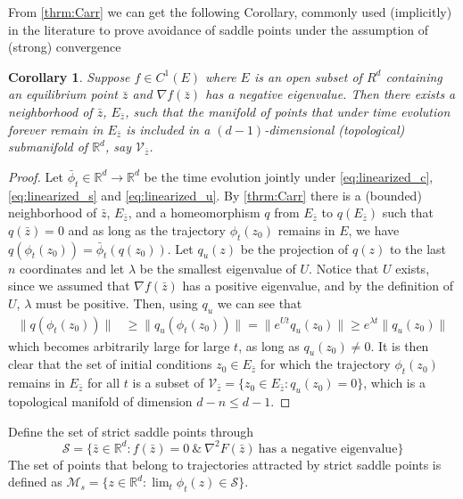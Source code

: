 \documentclass[reqno]{amsart}
\theoremstyle{plain}
\newtheorem{corollary}{Corollary}	%
\theoremstyle{definition}
\theoremstyle{remark}
\begin{document}
From \ref{thrm:Carr} we can get the following Corollary, commonly used (implicitly) in the literature to prove avoidance of saddle points under the assumption of (strong) convergence \cite{castera2023inertial,maulen2024inertial}
\begin{corollary}
\label{cor:avoidstrong}
	Suppose $f \in C^{1}(E)$ where $E$ is an open subset of $R^{d}$ containing an equilibrium point $\bar{z}$ and $\nabla f(\bar{z})$ has a negative eigenvalue. Then there exists a neighborhood of $\bar{z}$, $E_{\bar{z}}$, such that the manifold of points that under time evolution forever remain in $E_{\bar{z}}$ is included in a $(d-1)$-dimensional (topological) submanifold of $\mathbb{R}^{d}$, say $\mathcal{V}_{\bar{z}}$.
\end{corollary}
\begin{proof}
    Let $\bar{\phi}_t \in \mathbb{R}^d\to\mathbb{R}^d$ be the time evolution jointly under \eqref{eq:linearized_c}, \eqref{eq:linearized_s} and \eqref{eq:linearized_u}.
    By \ref{thrm:Carr} there is a (bounded) neighborhood of $\bar{z}$, $E_{\bar{z}}$, and a homeomorphism $q$ from $E_{\bar{z}}$ to $q(E_{\bar{z}})$ such that $q(\bar{z})=0$ and as long as the trajectory $\phi_t(z_0)$ remains in $E$, we have $q(\phi_t(z_0)) = \bar{\phi}_t(q(z_0))$. 
    Let $q_u(z)$ be the projection of $q(z)$ to the last $n$ coordinates and let $\lambda$ be the smallest eigenvalue of $U$. 
    Notice that $U$ exists, since we assumed that $\nabla f (\bar{z})$ has a positive eigenvalue, and by the definition of $U$, $\lambda$ must be positive. 
    Then, using $q_u$ we can see that
    \begin{align}
        \| q(\phi_t(z_0)) \| &\geq \| q_u(\phi_t(z_0)) \| 
        = \| e^{Ut} q_u(z_0) \| 
        \geq e^{\lambda t} \| q_u(z_0) \| 
    \end{align}
    which becomes arbitrarily large for large $t$, as long as $q_u(z_0) \neq 0$. 
    It is then clear that the set of initial conditions $z_0 \in E_{\bar{z}}$ for which the trajectory $\phi_t(z_0)$ remains in $E_{\bar{z}}$ for all $t$ is a subset of $\mathcal{V}_{\bar{z}} = \{z_0 \in E_{\bar{z}} : q_u(z_0) = 0\}$, which is a topological manifold of dimension $d-n \leq d-1$. 
\end{proof}

Define the set of strict saddle points through 
\begin{equation} 
	\mathcal{S} = \{\bar{z}\in\mathbb{R}^{d}: f(\bar{z})=0 \ \& \ \nabla^2 F(\bar{z}) \ \text{has a negative eigenvalue} \}	
\end{equation} 
The set of points that belong to trajectories attracted by strict saddle points is defined as $\mathcal{M}_s=\{z\in\mathbb{R}^d:\lim_t \phi_t(z) \in \mathcal{S}\}$. 
\end{document}
